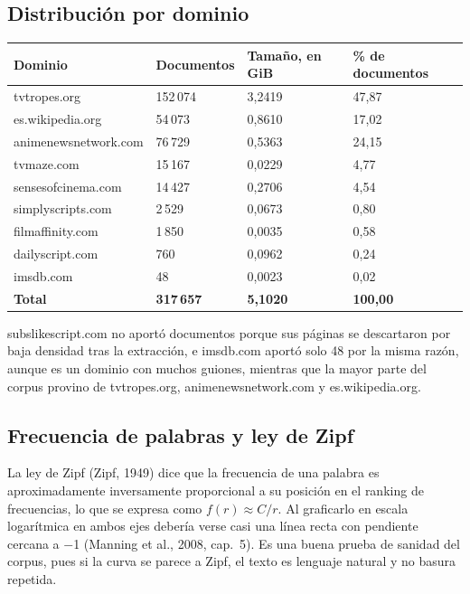 \documentclass[11pt,spanish]{article}
\begin{document}
\subsection{Distribución por dominio}

\begin{center}
\begin{tabularx}{\linewidth}{lYYY}
\toprule
\textbf{Dominio} & \textbf{Documentos} & \textbf{Tamaño, en GiB} & \textbf{\% de documentos} \\
\midrule
tvtropes.org & 152\,074 & 3,2419 & 47,87 \\
es.wikipedia.org & 54\,073 & 0,8610 & 17,02 \\
animenewsnetwork.com & 76\,729 & 0,5363 & 24,15 \\
tvmaze.com & 15\,167 & 0,0229 & 4,77 \\
sensesofcinema.com & 14\,427 & 0,2706 & 4,54 \\
simplyscripts.com & 2\,529 & 0,0673 & 0,80 \\
filmaffinity.com & 1\,850 & 0,0035 & 0,58 \\
dailyscript.com & 760 & 0,0962 & 0,24 \\
imsdb.com & 48 & 0,0023 & 0,02 \\
\midrule
\textbf{Total} & \textbf{317\,657} & \textbf{5,1020} & \textbf{100,00} \\
\bottomrule
\end{tabularx}
\end{center}

subslikescript.com no aportó documentos porque sus páginas se descartaron por baja densidad tras la extracción, e imsdb.com aportó solo 48 por la misma razón, aunque es un dominio con muchos guiones, mientras que la mayor parte del corpus provino de tvtropes.org, animenewsnetwork.com y es.wikipedia.org.

\subsection{Frecuencia de palabras y ley de Zipf}

La ley de Zipf (Zipf, 1949) dice que la frecuencia de una palabra es aproximadamente inversamente proporcional a su posición en el ranking de frecuencias, lo que se expresa como $f(r) \approx C / r$. Al graficarlo en escala logarítmica en ambos ejes debería verse casi una línea recta con pendiente cercana a $-$1 (Manning et al., 2008, cap.\ 5). Es una buena prueba de sanidad del corpus, pues si la curva se parece a Zipf, el texto es lenguaje natural y no basura repetida.
\end{document}
